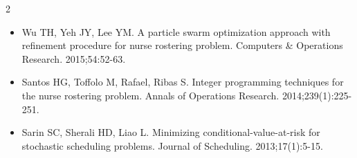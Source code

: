 \documentclass[1pt,a4paper]{article}
\begin{document}
\begin{multicols}{2}
\begin{itemize}[leftmargin=*]
\item [18] Wu TH, Yeh JY, Lee YM. A particle swarm optimization approach with refinement procedure for nurse rostering problem. Computers \& Operations Research. 2015;54:52-63.

\item [19] Santos HG, Toffolo M, Rafael, Ribas S. Integer programming techniques for the nurse rostering problem. Annals of Operations Research. 2014;239(1):225-251.

\item [20] Sarin SC, Sherali HD, Liao L. Minimizing conditional-value-at-risk for stochastic scheduling problems. Journal of Scheduling. 2013;17(1):5-15.

\end{itemize}
\end{multicols}
\end{document}
